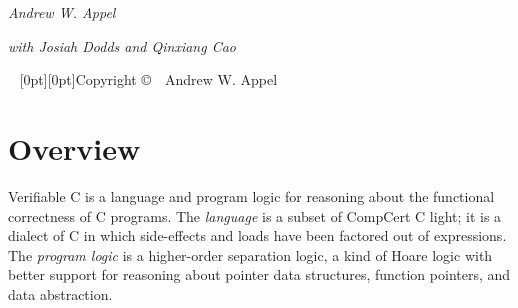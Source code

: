\documentclass[12pt,fleqn,openany,oneside,showtrims]{memoir}
\begin{document}
\frontmatter
{}
\thispagestyle{empty}%
{
\centering
  \vspace*{4pc}%
  \fontsize{48}{48}\selectfont\par{}%

\vskip50pt
  \fontsize{20}{30}\selectfont\par{}%

\vskip50pt
  \fontsize{14}{16}\selectfont\par{}
\vskip100pt
\par
\vskip10pt
{\fontsize{24}{30}\selectfont\par\noindent%
{\itshape Andrew W. Appel}}\par
\vskip10pt
{\fontsize{16}{19}\selectfont\par\noindent%
{\centering \itshape with Josiah Dodds and Qinxiang Cao\\}}
}

~\vfill
\setlength{\parindent}{0pt}
\setlength{\parskip}{\baselineskip}
\clearpage
\raisebox{-7in}[0pt][0pt]{Copyright \copyright\ \the\year\ Andrew W. Appel}

\tableofcontents  %

\clearpage
\savepagenumber
\mainmatter
\restorepagenumber
\renewcommand{\chaptermark}[1]{\markboth{\thechapter.~#1\hfill{\textcolor{red}\thefile}\hspace*{2em}}{}}

\chapter{Overview}
Verifiable C is a language and program logic for reasoning about the
functional correctness of C programs.  The \emph{language} is
a subset of CompCert C light; it is a dialect of C in which
side-effects and loads have been factored out of expressions.
The \emph{program logic} is a higher-order separation logic,
a kind of Hoare logic with better support for reasoning about
pointer data structures, function pointers, and data abstraction.
\end{document}
